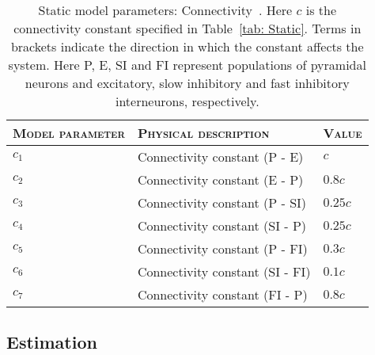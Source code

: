 \begin{center}%
	\begin{table}
			\caption[Static Model Parameters: Connectivity]{Static model parameters: Connectivity~\citep{wendling2002epileptic}. Here $c$ is the connectivity constant specified in Table~\ref{tab: Static}. Terms in brackets indicate the direction in which the constant affects the system. Here P, E, SI and FI represent populations of pyramidal neurons and excitatory, slow inhibitory and fast inhibitory interneurons, respectively.}
		\begin{tabular}{||p{4cm}|p{7cm}|p{2cm}||}\hline
			 \textsc{Model parameter}  & \textsc{Physical description} & \textsc{Value}
			   \\\hline\hline
			 $c_{1}$ & Connectivity constant (P - E) & $c$ \\\hline
			 $c_{2}$ & Connectivity constant (E - P) & $0.8c$ \\\hline
			 $c_{3}$ & Connectivity constant (P - SI) & $0.25c$  \\\hline
			 $c_{4}$ & Connectivity constant (SI - P)& $0.25c$ \\\hline
			 $c_{5}$ & Connectivity constant (P - FI) & $0.3c$ \\\hline
			 $c_{6}$ & Connectivity constant (SI - FI) & $0.1c$ \\\hline
			 $c_{7}$ & Connectivity constant (FI - P) & $0.8c$ \\\hline\hline
		\end{tabular}
		\label{tab: Connectivity}
	\end{table}
\end{center}%
\normalsize
\onehalfspacing

\subsection{Estimation}

